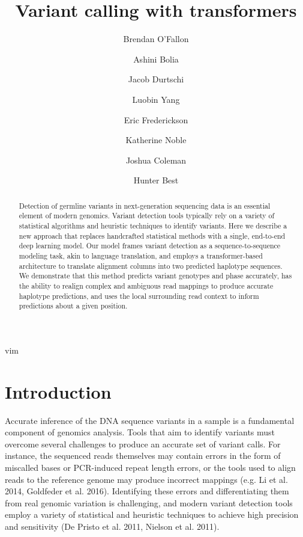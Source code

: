 \documentclass[]{article}
\title{Variant calling with transformers}
\author[1]{Brendan O'Fallon}
\author[1]{Ashini Bolia}
\author[1]{Jacob Durtschi}
\author[1]{Luobin Yang}
\author[1]{Eric Frederickson}
\author[1]{Katherine Noble}
\author[1]{Joshua Coleman}
\author[1]{Hunter Best}
\affil[1]{ARUP Institute for Clinical and Experimental Pathology, Salt Lake City, UT}
\date{}
\begin{document}
\maketitle

\begin{abstract}
	Detection of germline variants in next-generation sequencing data is an essential element of modern genomics. Variant detection tools typically rely on a variety of statistical algorithms and heuristic techniques to identify variants. Here we describe a new approach that replaces handcrafted statistical methods with a single, end-to-end deep learning model. Our model frames variant detection as a sequence-to-sequence modeling task, akin to language translation, and employs a transformer-based architecture to translate alignment columns into two predicted haplotype sequences. We demonstrate that this method predicts variant genotypes and phase accurately, has the ability to realign complex and ambiguous read mappings to produce accurate haplotype predictions, and uses the local surrounding read context to inform predictions about a given position. 

\end{abstract}

vim

\section{Introduction}

Accurate inference of the DNA sequence variants in a sample is a fundamental component of genomics analysis. Tools that aim to identify variants must overcome several challenges to produce an accurate set of variant calls. For instance, the sequenced reads themselves may contain errors in the form of miscalled bases or PCR-induced repeat length errors, or the tools used to align reads to the reference genome may produce incorrect mappings (e.g. Li et al. 2014, Goldfeder et al. 2016). Identifying these errors and differentiating them from real genomic variation is challenging, and modern variant detection tools employ a variety of statistical and heuristic techniques to achieve high precision and sensitivity (De Pristo et al. 2011, Nielson et al. 2011). 
\end{document}
